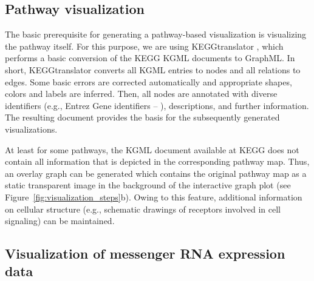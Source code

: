 \documentclass{bioinfo}
\begin{document}
\subsection{Pathway visualization}

The basic prerequisite for generating a pathway-based visualization is visualizing the pathway
itself. For this purpose, we are using KEGGtranslator \citep[see][]{Wrzodek2011}, which performs a
basic conversion of the KEGG KGML documents to GraphML. In short, KEGGtranslator converts all KGML entries to nodes
and all relations to edges. Some basic errors are corrected automatically and appropriate shapes,
colors and labels are inferred. Then, all nodes are annotated with diverse identifiers (e.g., Entrez Gene
identifiers -- \citealp{EntrezGene}),
descriptions, and further information. The resulting document provides the basis for the
subsequently generated visualizations.

%

At least for some pathways, the KGML document available at KEGG does not contain all information
that is depicted in the corresponding pathway map. Thus, an overlay graph can be generated which contains the
original pathway map as a static transparent image in the background of the interactive graph plot
(see Figure~\ref{fig:visualization_steps}b). Owing to this feature, additional information on
cellular structure (e.g., schematic drawings of receptors involved in cell signaling) can be maintained.



\subsection{Visualization of messenger RNA expression data}
\end{document}
